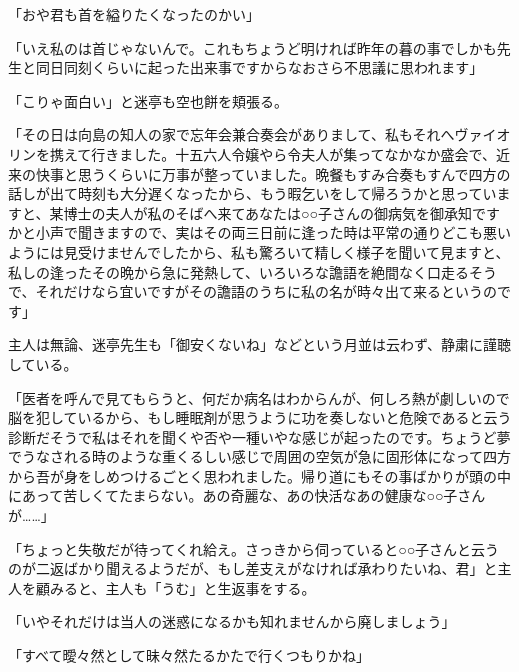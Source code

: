 \documentclass[12pt, openright]{book}
\begin{document}
「おや君も首を縊りたくなったのかい」

「いえ私のは首じゃないんで。これもちょうど明ければ昨年の暮の事でしかも先生と同日同刻くらいに起った出来事ですからなおさら不思議に思われます」

「こりゃ面白い」と迷亭も空也餅を頬張る。

「その日は向島の知人の家で忘年会兼合奏会がありまして、私もそれへヴァイオリンを携えて行きました。十五六人令嬢やら令夫人が集ってなかなか盛会で、近来の快事と思うくらいに万事が整っていました。晩餐もすみ合奏もすんで四方の話しが出て時刻も大分遅くなったから、もう暇乞いをして帰ろうかと思っていますと、某博士の夫人が私のそばへ来てあなたは○○子さんの御病気を御承知ですかと小声で聞きますので、実はその両三日前に逢った時は平常の通りどこも悪いようには見受けませんでしたから、私も驚ろいて精しく様子を聞いて見ますと、私しの逢ったその晩から急に発熱して、いろいろな譫語を絶間なく口走るそうで、それだけなら宜いですがその譫語のうちに私の名が時々出て来るというのです」

主人は無論、迷亭先生も「御安くないね」などという月並は云わず、静粛に謹聴している。

「医者を呼んで見てもらうと、何だか病名はわからんが、何しろ熱が劇しいので脳を犯しているから、もし睡眠剤が思うように功を奏しないと危険であると云う診断だそうで私はそれを聞くや否や一種いやな感じが起ったのです。ちょうど夢でうなされる時のような重くるしい感じで周囲の空気が急に固形体になって四方から吾が身をしめつけるごとく思われました。帰り道にもその事ばかりが頭の中にあって苦しくてたまらない。あの奇麗な、あの快活なあの健康な○○子さんが\ldots{}\ldots{}」

「ちょっと失敬だが待ってくれ給え。さっきから伺っていると○○子さんと云うのが二返ばかり聞えるようだが、もし差支えがなければ承わりたいね、君」と主人を顧みると、主人も「うむ」と生返事をする。

「いやそれだけは当人の迷惑になるかも知れませんから廃しましょう」

「すべて曖々然として昧々然たるかたで行くつもりかね」
\end{document}
